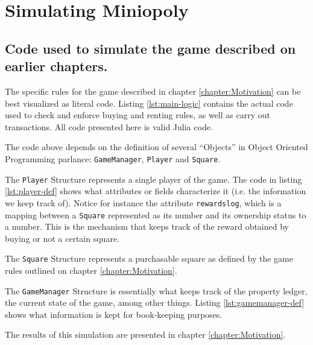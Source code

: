 \chapter{Simulating Miniopoly}
\label{appendix:MiniopolySim}

\section*{Code used to simulate the game described on earlier 
chapters.}

The specific rules for the game described in chapter 
\ref{chapter:Motivation} can be best visualized as literal 
code. Listing \ref{lst:main-logic} contains the actual code 
used to check and enforce buying and renting rules, as well as 
carry out transactions. All code presented here is valid Julia 
code.



The code above depends on the definition of several ``Objects'' 
in Object Oriented Programming parlance: 
\lstinline{GameManager}, \lstinline{Player} and 
\lstinline{Square}.

The \lstinline{Player} Structure represents a single player of the game. The
code in listing \ref{lst:player-def} shows what attributes or fields
characterize it (i.e. the information we keep track of). Notice for instance the
attribute \lstinline{rewardslog}, which is a mapping between a 
\lstinline{Square} represented as its number and its ownership status to a
number. This is the mechanism that keeps track of the reward obtained by buying
or not a certain square.



The \lstinline{Square} Structure represents a purchasable 
square as defined by the game rules outlined on chapter 
\ref{chapter:Motivation}. 



The \lstinline{GameManager} Structure is essentially what keeps 
track of the property ledger, the current state of the game, 
among other things. Listing \ref{lst:gamemanager-def} shows 
what information is kept for book-keeping purposes.



The results of this simulation are presented in chapter
\ref{chapter:Motivation}.